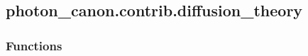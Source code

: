 \documentclass[letterpaper,10pt,english]{sphinxmanual}
\begin{document}
\sphinxstepscope


\subsection{photon\_canon.contrib.diffusion\_theory}
\label{\detokenize{generated/photon_canon.contrib.diffusion_theory:module-photon_canon.contrib.diffusion_theory}}\label{\detokenize{generated/photon_canon.contrib.diffusion_theory:photon-canon-contrib-diffusion-theory}}\label{\detokenize{generated/photon_canon.contrib.diffusion_theory::doc}}\subsubsection*{Functions}
\end{document}
